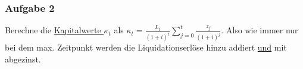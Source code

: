 	\subsubsection*{Aufgabe 2}
	Berechne die \hyperref[Kapitalwert]{Kapitalwerte $\kappa_t$} als $\kappa_t=\frac{L_t}{(1+i)^t}\sum_{j=0}^t \frac{z_j}{(1+i)^j}$. Also wie immer nur bei dem max. Zeitpunkt werden die Liquidationserlöse hinzu addiert \underline{und} mit abgezinst.
	
	